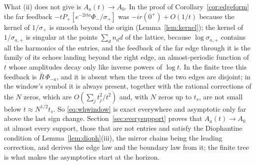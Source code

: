 \documentclass[11pt]{article}
\theoremstyle{definition}
\theoremstyle{remark}
\begin{document}
What (ii) does not give is $A_a(t)\to A_0$. In the proof of Corollary~\ref{cor:edgeform} the far feedback $-tP_+[e^{-2ita}\Phi_-/\sigma_+]$ was $-ir(0^+)+O(1/t)$ because the kernel of $1/\sigma_+$ is smooth beyond the origin (Lemma~\ref{lem:kernel}); the kernel of $1/\sigma_{a,+}$ is singular at the points $\sum_dn_dd$ of the lattice, because $\log\sigma_{a,+}$ contains all the harmonics of the entries, and the feedback of the far edge through it is the family of its echoes landing beyond the right edge, an almost-periodic function of $t$ whose amplitudes decay only like inverse powers of $\log t$. In the finite tree this feedback is $\bar R\,\Phi_{-a}$, and it is absent when the trees of the two edges are disjoint; in the window's symbol it is always present, together with the rational corrections of the $N$ zeros, which are $O(\sum_jt_j^2/t^2)$ and, with $N$ zeros up to $t_s$, are not small below $t\approx N^{1/2}t_s$. So \eqref{eq:whwindow} is exact everywhere and asymptotic only far above the last sign change. Section~\ref{sec:everysupport} proves that $A_a(t)\to A_0$ at almost every support, those that are not entries and satisfy the Diophantine condition of Lemma~\ref{lem:dioph}(iii), the mirror chains being the leading correction, and derives the edge law and the boundary law from it; the finite tree is what makes the asymptotics start at the horizon.
\end{document}
